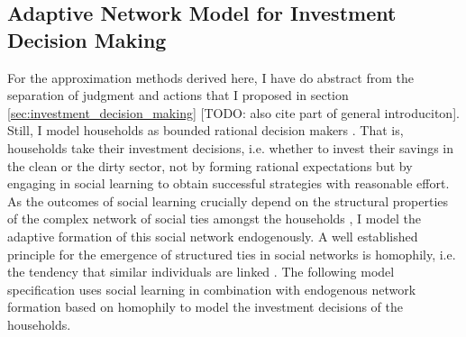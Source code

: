 \subsection{Adaptive Network Model for Investment Decision Making}
\label{sec:investment_decision_making_descr.}
For the approximation methods derived here, I have do abstract from the separation of judgment and actions that I proposed in section \ref{sec:investment_decision_making} [TODO: also cite part of general introduciton].
Still, I model households as bounded rational decision makers \citep{simon1972theories, simon1982models, gigerenzer2002bounded}.
That is, households take their investment decisions, i.e. whether to invest their savings in the clean or the dirty sector, not by forming rational expectations \citep{Evans2006, Kirman2014} but by engaging in social learning \citep{Bandura1971} to obtain successful strategies \citep{Traulsen2010} with reasonable effort.
As the outcomes of social learning crucially depend on the structural properties of the complex network of social ties amongst the households \citep{Barkoczi2016}, I model the adaptive formation of this social network endogenously.
A well established principle for the emergence of structured ties in social networks is homophily, i.e. the tendency that similar individuals are linked \citep{McPherson2007, Centola2007, Centola2011}.
The following model specification uses social learning in combination with endogenous network formation based on homophily to model the investment decisions of the households.

